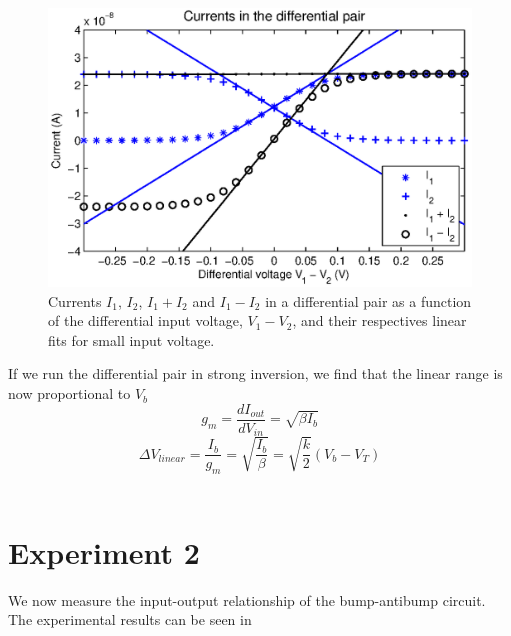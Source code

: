 \begin{figure}
    \center
    \includegraphics{q1.eps}
    \caption{Currents \(I_1\), \(I_2\), \(I_1+I_2\) and \(I_1-I_2\) in a differential pair as a function of the differential input voltage, \(V_1-V_2\), and their respectives linear fits for small input voltage.}
    \label{fig:ex1}
\end{figure}

If we run the differential pair in strong inversion, we find that the linear range is now proportional to \(V_b\)
\begin{equation*}
g_m = \frac{dI_{out}}{dV_{in}} = \sqrt{\beta I_b}
\end{equation*}
\begin{equation*}
\Delta V_{linear} = \frac{I_b}{g_m}=\sqrt{\frac{I_b}{\beta}} = \sqrt{\frac{k}{2}}(V_b-V_T)
\end{equation*}
\\
\section{Experiment 2}

We now measure the input-output relationship of the bump-antibump circuit. The experimental results can be seen in 

